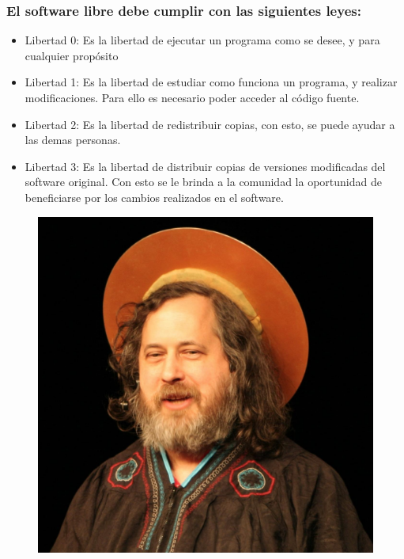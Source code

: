 \documentclass[spanish]{beamer}
\begin{document}
\begin{frame}
	\frametitle{El software libre debe cumplir con las siguientes leyes:}
	\begin{multicols}{2}
		\begin{itemize}
			\item Libertad 0: Es la libertad de ejecutar un programa como se desee, y para cualquier propósito
			\item Libertad 1: Es la libertad de estudiar como funciona un programa, y realizar modificaciones. Para ello es necesario poder acceder al código fuente.
			\item Libertad 2: Es la libertad de redistribuir copias, con esto, se puede ayudar a las demas personas.
			\item Libertad 3: Es la libertad de distribuir copias de versiones modificadas del software original. Con esto se le brinda a la comunidad la oportunidad de beneficiarse por los cambios realizados en el software.
		\end{itemize}
	
	\begin{figure}
		\centering
		\includegraphics[width=0.7\linewidth]{stallman}
	\end{figure}
	\end{multicols}
	\end{frame}
\end{document}
